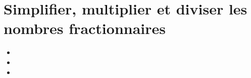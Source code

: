 \chapter{Simplifier, multiplier et diviser les nombres fractionnaires}\label{ChSimpMulDivFrac}

\vspace{5cm}
\begin{acquis}
\begin{itemize}
\item 
\item 
\item 
\end{itemize}
\end{acquis}


\activites


\cours


\exercicesbase
\begin{colonne*exercice}

\end{colonne*exercice}


\exercicesappr
\begin{colonne*exercice}
%
\end{colonne*exercice}

\connaissances
%

\TravauxPratiques
%

\recreation %
%


